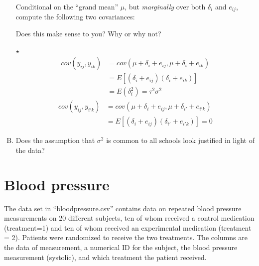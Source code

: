 \documentclass[11pt]{article}
\newcommand{\jie}{$\star$ }
\begin{document}
\begin{enumerate}[(A)]
Conditional on the ``grand mean'' $\mu$, but \emph{marginally} over both $\delta_i$ and $e_{ij}$, compute the following two covariances:


Does this make sense to you?  Why or why not?  

\bigskip
\jie
\begin{align*}
    cov(y_{ij}, y_{ik}) &= cov(\mu + \delta_i + e_{ij}, \mu + \delta_i + e_{ik}) \\
    &= E[(\delta_i + e_{ij})(\delta_i + e_{ik})] \\
    &= E(\delta_i^2) = \tau^2 \sigma^2
\end{align*}
\begin{align*}
    cov(y_{ij}, y_{i'k}) &= cov(\mu + \delta_i + e_{ij}, \mu + \delta_{i'} + e_{i'k}) \\
    &=E[(\delta_i + e_{ij})(\delta_{i'} + e_{i'k})] = 0
\end{align*}

\item Does the assumption that $\sigma^2$ is common to all schools look justified in light of the data?  

\end{enumerate}


\section{Blood pressure}

The data set in ``bloodpressure.csv'' contains data on repeated blood pressure measurements on 20 different subjects, ten of whom received a control medication (treatment=1) and ten of whom received an experimental medication (treatment = 2).  Patients were randomized to receive the two treatments.  The columns are the data of measurement, a numerical ID for the subject, the blood pressure measurement (systolic), and which treatment the patient received.
\end{document}
